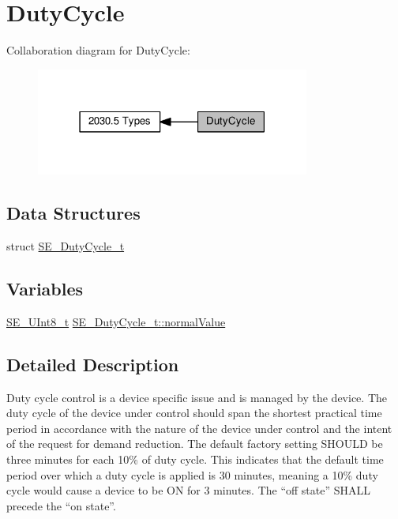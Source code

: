 \hypertarget{group__DutyCycle}{}\section{Duty\+Cycle}
\label{group__DutyCycle}
Collaboration diagram for Duty\+Cycle\+:\nopagebreak
\begin{figure}[H]
\begin{center}
\leavevmode
\includegraphics[width=255pt]{group__DutyCycle}
\end{center}
\end{figure}
\subsection*{Data Structures}
\begin{DoxyCompactItemize}
\item 
struct \hyperlink{structSE__DutyCycle__t}{S\+E\+\_\+\+Duty\+Cycle\+\_\+t}
\end{DoxyCompactItemize}
\subsection*{Variables}
\begin{DoxyCompactItemize}
\item 
\hyperlink{group__UInt8_gaf7c365a1acfe204e3a67c16ed44572f5}{S\+E\+\_\+\+U\+Int8\+\_\+t} \hyperlink{group__DutyCycle_ga11141a0c1bf2a7bdbf3d85b845792070}{S\+E\+\_\+\+Duty\+Cycle\+\_\+t\+::normal\+Value}
\end{DoxyCompactItemize}


\subsection{Detailed Description}
Duty cycle control is a device specific issue and is managed by the device. The duty cycle of the device under control should span the shortest practical time period in accordance with the nature of the device under control and the intent of the request for demand reduction. The default factory setting S\+H\+O\+U\+LD be three minutes for each 10\% of duty cycle. This indicates that the default time period over which a duty cycle is applied is 30 minutes, meaning a 10\% duty cycle would cause a device to be ON for 3 minutes. The “off state” S\+H\+A\+LL precede the “on state”. 

